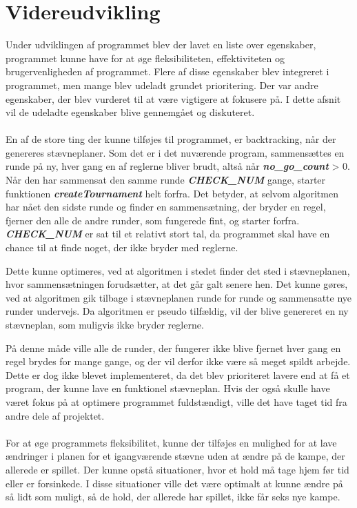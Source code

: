 \section{Videreudvikling}
Under udviklingen af programmet blev der lavet en liste over egenskaber, programmet kunne have for at øge fleksibiliteten, effektiviteten og brugervenligheden af programmet. Flere af disse egenskaber blev integreret i programmet, men mange blev udeladt grundet prioritering. Der var andre egenskaber, der blev vurderet til at være vigtigere at fokusere på. I dette afsnit vil de udeladte egenskaber blive gennemgået og diskuteret. 
\\\\
En af de store ting der kunne tilføjes til programmet, er backtracking, når der genereres stævneplaner. Som det er i det nuværende program, sammensættes en runde på ny, hver gang en af reglerne bliver brudt, altså når \textbf{\textit{no\_go\_count}} > 0. Når den har sammensat den samme runde \textbf{\textit{CHECK\_NUM}} gange, starter funktionen \textbf{\textit{createTournament}} helt forfra. Det betyder, at selvom algoritmen har nået den sidste runde og finder en sammensætning, der bryder en regel, fjerner den alle de andre runder, som fungerede fint, og starter forfra. \textbf{\textit{CHECK\_NUM}} er sat til et relativt stort tal, da programmet skal have en chance til at finde noget, der ikke bryder med reglerne.
\par
Dette kunne optimeres, ved at algoritmen i stedet finder det sted i stævneplanen, hvor sammensætningen forudsætter, at det går galt senere hen. Det kunne gøres, ved at algoritmen gik tilbage i stævneplanen runde for runde og sammensatte nye runder undervejs. Da algoritmen er pseudo tilfældig, vil der blive genereret en ny stævneplan, som muligvis ikke bryder reglerne. 
\par
På denne måde ville alle de runder, der fungerer ikke blive fjernet hver gang en regel brydes for mange gange, og der vil derfor ikke være så meget spildt arbejde. Dette er dog ikke blevet implementeret, da det blev prioriteret lavere end at få et program, der kunne lave en funktionel stævneplan. Hvis der også skulle have været fokus på at optimere programmet fuldstændigt, ville det have taget tid fra andre dele af projektet.
\\\\
For at øge programmets fleksibilitet, kunne der tilføjes en mulighed for at lave ændringer i planen for et igangværende stævne uden at ændre på de kampe, der allerede er spillet. Der kunne opstå situationer, hvor et hold må tage hjem før tid eller er forsinkede. I disse situationer ville det være optimalt at kunne ændre på så lidt som muligt, så de hold, der allerede har spillet, ikke får seks nye kampe.
